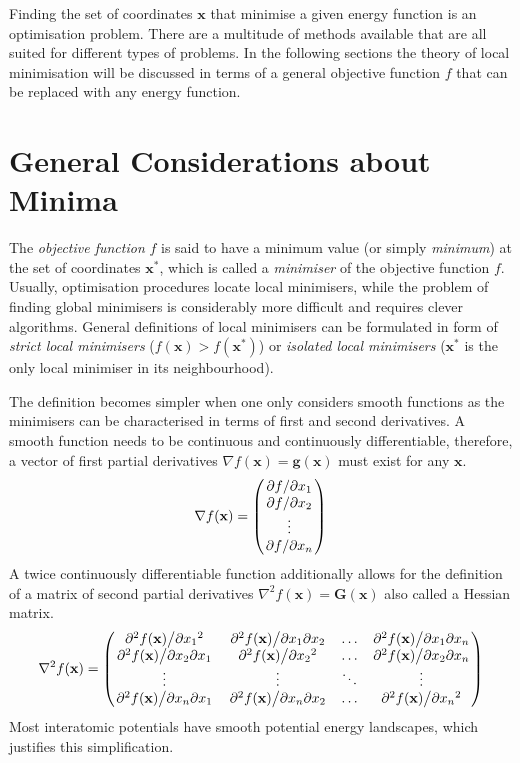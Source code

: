 Finding the set of coordinates $\mathbf{x}$ that minimise a given energy
function is an optimisation problem. There are a multitude of methods available
that are all suited for different types of problems. In the following sections
the theory of local minimisation will be discussed in terms of a general
objective function $f$ that can be replaced with any energy function.

\section{General Considerations about Minima}
\label{sec:GeneralRemarksAboutMinima}

The \textit{objective function} $f$ is said to have a minimum value (or simply
\textit{minimum}) at the set of coordinates $\mathbf{x^*}$, which is called a
\textit{minimiser} of the objective function $f$. Usually, optimisation
procedures locate local minimisers, while the problem of finding global
minimisers is considerably more difficult and requires clever algorithms.
General definitions of local minimisers can be formulated in form of
\textit{strict local minimisers} ($f(\mathbf{x})>f(\mathbf{x^*})$) or
\textit{isolated local minimisers} ($\mathbf{x^*}$ is the only local minimiser
in its neighbourhood).

The definition becomes simpler when one only considers smooth functions as the
minimisers can be characterised in terms of first and second derivatives. A
smooth function needs to be continuous and continuously differentiable,
therefore, a vector of first partial derivatives $\nabla
f(\mathbf{x})=\mathbf{g}(\mathbf{x})$ must exist for any $\mathbf{x}$.
%
\begin{equation}
    \nabla f(\mathbf{x})=
    \begin{pmatrix}
        \pdv*{f}{x_1}\\
        \pdv*{f}{x_2}\\
        \vdots\\
        \pdv*{f}{x_n}
    \end{pmatrix}
\end{equation}
%
A twice continuously differentiable function additionally allows for the
definition of a matrix of second partial derivatives $\nabla^2
f(\mathbf{x})=\mathbf{G}(\mathbf{x})$ also called a Hessian matrix.
%
\begin{equation}
    \nabla^2 f(\mathbf{x})=
    \begin{pmatrix}
        \pdv*[2]{f(\mathbf{x})}{{x_1}} & \pdv*{f(\mathbf{x})}{x_1}{x_2} & \ldots & \pdv*{f(\mathbf{x})}{x_1}{x_{n}}\\
        \pdv*{f(\mathbf{x})}{x_2}{x_1} & \pdv*[2]{f(\mathbf{x})}{{x_2}} & \ldots & \pdv*{f(\mathbf{x})}{x_2}{x_{n}}\\
        \vdots & \vdots & \ddots & \vdots\\
        \pdv*{f(\mathbf{x})}{x_{n}}{x_1} & \pdv*{f(\mathbf{x})}{x_{n}}{x_2} & \ldots & \pdv*[2]{f(\mathbf{x})}{{x_{n}}}
    \end{pmatrix}
\end{equation}
%
Most interatomic potentials have smooth potential energy landscapes, which
justifies this simplification. 

